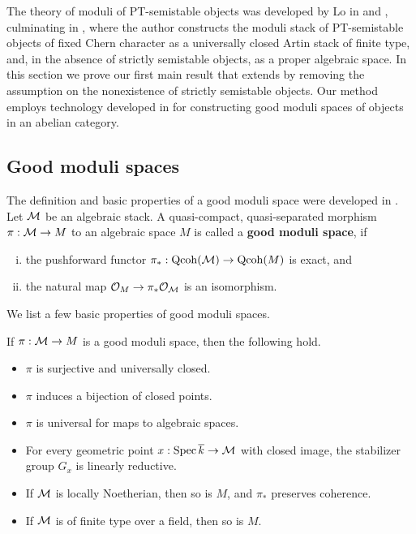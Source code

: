 The theory of moduli of PT-semistable objects was developed by Lo in \cite{lo-PT1} and \cite{lo-PT2}, culminating in \cite[Theorem 1.1]{lo-PT2}, where the author constructs the moduli stack of PT-semistable objects of fixed Chern character as a universally closed Artin stack of finite type, and, in the absence of strictly semistable objects, as a proper algebraic space. In this section we prove our first main result that extends \cite[Theorem 1.1(2)]{lo-PT2} by removing the assumption on the nonexistence of strictly semistable objects. Our method employs technology developed in \cite[Section 7]{AHLH} for constructing good moduli spaces of objects in an abelian category. 

\subsection{Good moduli spaces}
The definition and basic properties of a good moduli space were developed in \cite{AlperGMS}. Let $\mathcal{M}$ be an algebraic stack. A quasi-compact, quasi-separated morphism $\pi: \mathcal{M} \to M$ to an algebraic space $M$ is called a {\bf good moduli space}, if 
\begin{enumerate}[(i)]
    \item the pushforward functor $\pi_*: \operatorname{\mathrm{Qcoh}}(\mathcal{M}) \to \operatorname{\mathrm{Qcoh}}(M)$ is exact, and
    \item the natural map $\mathcal{O}_M \to \pi_*\mathcal{O}_{\mathcal{M}}$ is an isomorphism.
\end{enumerate}
We list a few basic properties of good moduli spaces.
\begin{prop}
    If $\pi: \mathcal{M} \to M$ is a good moduli space, then the following hold. \begin{itemize}
        \item $\pi$ is surjective and universally closed.
        \item $\pi$ induces a bijection of closed points.
        \item $\pi$ is universal for maps to algebraic spaces.
        \item For every geometric point $x: \operatorname{\mathrm{Spec}} \overline{k} \to \mathcal{M}$ with closed image, the stabilizer group $G_x$ is linearly reductive.
        \item If $\mathcal{M}$ is locally Noetherian, then so is $M$, and $\pi_*$ preserves coherence.
        \item If $\mathcal{M}$ is of finite type over a field, then so is $M$.
    \end{itemize}
\end{prop}


